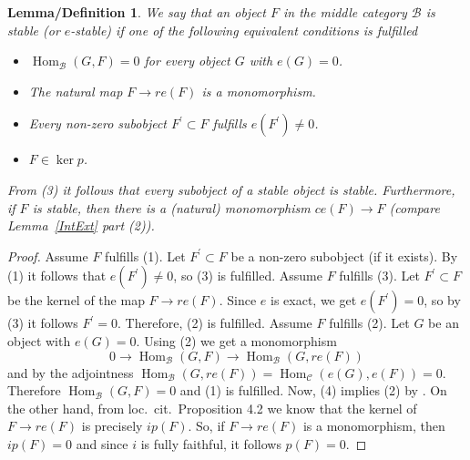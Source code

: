 \documentclass[11pt,a4paper]{amsart}
\theoremstyle{plain}
\newtheorem{lemdef}[thm]{Lemma/Definition}
\theoremstyle{definition}
\begin{document}
\begin{lemdef} \label{stable}
We say that an object $F$ in the middle category ${\mathcal{B}}$ is \emph{stable} (or \emph{${e} $-stable}) 
if one of the following equivalent conditions is fulfilled
\begin{itemize}
\item[(1)] $\operatorname{Hom}_{\mathcal{B}} (G, F) =0$ for every object $G$ with ${e} (G)=0$. 
\item[(2)] The natural map $F\to r{e} (F)$ is a monomorphism.
\item[(3)] Every non-zero subobject $F^\prime \subset F$ fulfills ${e} (F^\prime )\neq 0$. 
\item[(4)] $F\in \operatorname{ker} p$. 
\end{itemize}
From (3) it follows that every subobject of a stable object is stable. 
Furthermore, if $F$ is stable, then there is a (natural) monomorphism $ c {e} (F)\to F$ (compare Lemma~\ref{IntExt} part (2)). 
\end{lemdef}

\begin{proof}
Assume $F$ fulfills (1). Let $F^\prime \subset F$ be a non-zero subobject (if it exists). By (1) it follows that $e(F^\prime )\neq 0$, so (3) is fulfilled.
Assume $F$ fulfills (3). Let $F^\prime \subset F$ be the kernel of the map $F\to r{e} (F)$. Since ${e} $ is exact, we get $e(F^\prime)=0$, so by (3) it follows $F^\prime =0$. Therefore, (2) is fulfilled. 
Assume $F$ fulfills (2). Let $G$ be an object with $e(G)=0$. Using (2) we get a monomorphism 
\[
0\to \operatorname{Hom}_{\mathcal{B}} (G,F) \to \operatorname{Hom}_{\mathcal{B}} (G, re(F)) 
\]
and by the adjointness $\operatorname{Hom}_{\mathcal{B}} (G, re(F)) = \operatorname{Hom}_{\mathcal{C}} (e(G), e(F)) =0$. Therefore $\operatorname{Hom}_{\mathcal{B}} (G,F)=0$ and (1) is fulfilled. 
Now, (4) implies (2) by \cite[Proposition 4.9]{FP}. On the other hand, from loc.\ cit.\ Proposition 4.2 we know that the kernel of $F\to r{e} (F)$ is precisely $ip (F)$. So, if $F \to r{e} (F)$ is a monomorphism, then $ip (F)=0$ and since $i$ is fully faithful, it follows $p(F)=0$. 
\end{proof}
\end{document}
